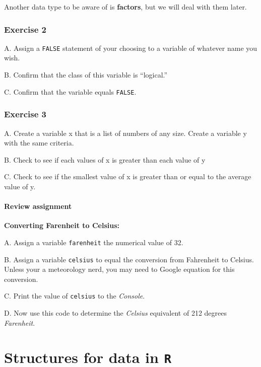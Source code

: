 \documentclass[
]{book}
\begin{document}
Another data type to be aware of is \textbf{factors}, but we will deal with them later.

\hypertarget{exercise-2-1}{%
\subsection*{Exercise 2}\label{exercise-2-1}}

A. Assign a \texttt{FALSE} statement of your choosing to a variable of whatever name you wish.

B. Confirm that the class of this variable is ``logical.''

C. Confirm that the variable equals \texttt{FALSE}.

\hypertarget{exercise-3-1}{%
\subsection*{Exercise 3}\label{exercise-3-1}}

A. Create a variable x that is a list of numbers of any size. Create a variable y with the same criteria.

B. Check to see if each values of x is greater than each value of y

C. Check to see if the smallest value of x is greater than or equal to the average value of y.

\hypertarget{review-assignment-2}{%
\subsubsection*{Review assignment}\label{review-assignment-2}}

\textbf{Converting Farenheit to Celsius:}

A. Assign a variable \texttt{farenheit} the numerical value of 32.

B. Assign a variable \texttt{celsius} to equal the conversion from Fahrenheit to Celsius. Unless your a meteorology nerd, you may need to Google equation for this conversion.

C. Print the value of \texttt{celsius} to the \emph{Console}.

D. Now use this code to determine the \emph{Celsius} equivalent of 212 degrees \emph{Farenheit}.

\hypertarget{structures-for-data-in-r}{%
\chapter{\texorpdfstring{Structures for data in \texttt{R}}{Structures for data in R}}\label{structures-for-data-in-r}}
\end{document}
